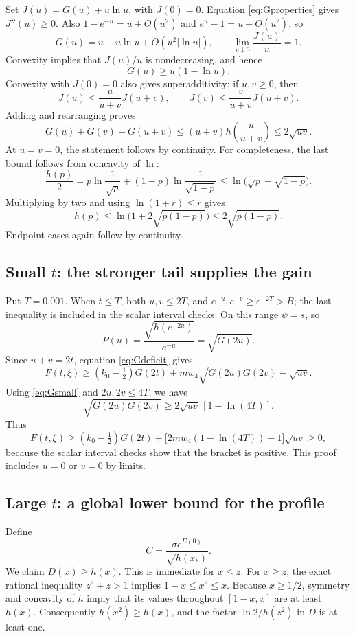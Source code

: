 \documentclass[11pt]{article}
\theoremstyle{remark}
\begin{document}
Set \(J(u)=G(u)+u\ln u\), with \(J(0)=0\).
Equation \eqref{eq:Gproperties} gives \(J''(u)\ge0\).
Also \(1-e^{-u}=u+O(u^2)\) and \(e^u-1=u+O(u^2)\), so
\[
G(u)=u-u\ln u+O(u^2|\ln u|),\qquad
\lim_{u\downarrow0}\frac{J(u)}u=1.
\]
Convexity implies that \(J(u)/u\) is nondecreasing, and hence
\begin{equation}\label{eq:Gsmall}
G(u)\ge u(1-\ln u).
\end{equation}
Convexity with \(J(0)=0\) also gives superadditivity:
if \(u,v\ge0\), then
\[
J(u)\le\frac{u}{u+v}J(u+v),\qquad
J(v)\le\frac{v}{u+v}J(u+v).
\]
Adding and rearranging proves
\begin{equation}\label{eq:Gdeficit}
G(u)+G(v)-G(u+v)
\le(u+v)h\left(\frac{u}{u+v}\right)\le2\sqrt{uv}.
\end{equation}
At \(u=v=0\), the statement follows by continuity.
For completeness, the last bound follows from concavity of \(\ln\):
\[
\frac{h(p)}2
=p\ln\frac1{\sqrt p}+(1-p)\ln\frac1{\sqrt{1-p}}
\le\ln\bigl(\sqrt p+\sqrt{1-p}\bigr).
\]
Multiplying by two and using \(\ln(1+r)\le r\) gives
\[
h(p)\le\ln\bigl(1+2\sqrt{p(1-p)}\bigr)
\le2\sqrt{p(1-p)}.
\]
Endpoint cases again follow by continuity.

\subsection{Small \texorpdfstring{\(t\)}{t}: the stronger tail supplies the gain}
Put \(T=0.001\). When \(t\le T\), both \(u,v\le2T\), and
\(e^{-u},e^{-v}\ge e^{-2T}>B\); the last inequality is included
in the scalar interval checks. On this range \(\psi=s\), so
\begin{equation}\label{eq:Ptail}
P(u)=\frac{\sqrt{h(e^{-2u})}}{e^{-u}}
=\sqrt{G(2u)}.
\end{equation}
Since \(u+v=2t\), equation \eqref{eq:Gdeficit} gives
\[
F(t,\xi)\ge(k_0-\tfrac12)G(2t)
+mw_4\sqrt{G(2u)G(2v)}-\sqrt{uv}.
\]
Using \eqref{eq:Gsmall} and \(2u,2v\le4T\), we have
\[
\sqrt{G(2u)G(2v)}
\ge2\sqrt{uv}\,[1-\ln(4T)].
\]
Thus
\begin{equation}\label{eq:smallt}
F(t,\xi)\ge(k_0-\tfrac12)G(2t)
+\bigl[2mw_4(1-\ln(4T))-1\bigr]\sqrt{uv}\ge0,
\end{equation}
because the scalar interval checks show that the bracket is positive. This proof includes \(u=0\) or \(v=0\) by limits.

\subsection{Large \texorpdfstring{\(t\)}{t}: a global lower bound for the profile}
Define
\begin{equation}\label{eq:Cmin}
C=\frac{\sigma e^{E(0)}}{\sqrt{h(x_*)}}.
\end{equation}
We claim \(D(x)\ge h(x)\). This is immediate for \(x\le z\).
For \(x\ge z\), the exact rational inequality \(z^2+z>1\)
implies \(1-x\le x^2\le x\). Because \(x\ge1/2\), symmetry and
concavity of \(h\) imply that its values throughout \([1-x,x]\)
are at least \(h(x)\). Consequently \(h(x^2)\ge h(x)\), and the
factor \(\ln2/h(z^2)\) in \(D\) is at least one.
\end{document}
